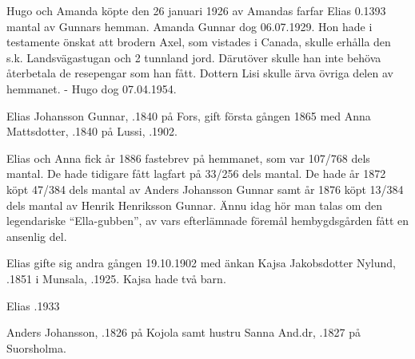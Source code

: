 Hugo och Amanda köpte den 26 januari 1926 av Amandas farfar Elias 0.1393 mantal av Gunnars hemman. Amanda Gunnar dog 06.07.1929. Hon hade i testamente önskat att brodern Axel, som vistades i Canada, skulle erhålla den s.k. Landsvägastugan och 2 tunnland jord. Därutöver skulle han inte behöva återbetala de resepengar som han fått. Dottern Lisi skulle ärva övriga delen av hemmanet. - Hugo dog 07.04.1954.



Elias Johansson Gunnar, .1840 på Fors, gift första gången 1865 med Anna Mattsdotter, .1840 på Lussi, .1902.
\begin{jhchildren}
  \item {}
  \item {}
  \item {}
\end{jhchildren}

Elias och Anna fick år 1886 fastebrev på hemmanet, som var 107/768 dels mantal. De hade tidigare fått lagfart på 33/256 dels mantal. De hade år 1872 köpt 47/384 dels mantal av Anders Johansson Gunnar samt år 1876 köpt 13/384 dels mantal av Henrik Henriksson Gunnar. Ännu idag hör man talas om den legendariske ``Ella-gubben'', av vars efterlämnade föremål hembygdsgården fått en ansenlig del.

Elias gifte sig andra gången 19.10.1902 med änkan Kajsa Jakobsdotter Nylund, .1851 i Munsala, .1925. Kajsa hade två barn.
\begin{jhchildren}
  \item {}
  \item {}
\end{jhchildren}

Elias .1933


Anders Johansson, .1826 på Kojola samt hustru Sanna And.dr, .1827 på Suorsholma.
\begin{jhchildren}
  \item {}
  \item {}
  \item {}
\end{jhchildren}

